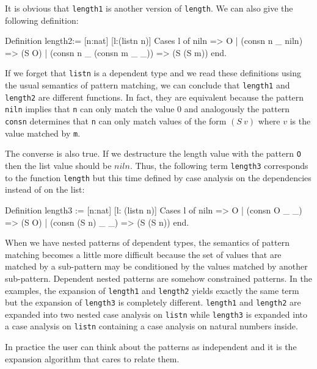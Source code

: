 It is obvious that \texttt{length1} is  another version of
\texttt{length}. We can also give the following definition:
\begin{coq_example}
Definition length2:= [n:nat] [l:(listn n)]
 Cases l of 
     niln                    => O
 | (consn n _ niln)          => (S O)
 | (consn n _ (consn m _ _)) => (S (S m))
 end.
\end{coq_example}

If we forget that \texttt{listn} is a dependent type and we read these
definitions using the usual semantics of pattern matching,  we can conclude
that \texttt{length1}
and \texttt{length2} are different functions.
In fact, they are equivalent
because the pattern \texttt{niln} implies that \texttt{n} can only match
the value $0$ and analogously the pattern \texttt{consn} determines that \texttt{n} can
only match  values of the form  $(S~v)$ where $v$ is the value matched by
\texttt{m}. 

The converse is also true. If
we destructure the  length  value with the pattern \texttt{O} then the list
value should be $niln$. 
Thus, the following term \texttt{length3} corresponds to the function
\texttt{length} but this time defined by case analysis on the dependencies instead of on the list:

\begin{coq_example}
Definition length3 := [n:nat] [l: (listn n)]
                         Cases l of 
                            niln              => O
                         |  (consn O _ _)     => (S O)
                         |  (consn (S n) _ _) => (S (S n))
                         end.
\end{coq_example}

When we have nested patterns of dependent types, the semantics of
pattern matching becomes a little more difficult because
the set of values that are matched by a sub-pattern may be conditioned by the
values matched by another sub-pattern. Dependent nested patterns are
somehow constrained patterns. 
In the examples, the expansion of
\texttt{length1} and \texttt{length2} yields exactly the same term
 but the
expansion of \texttt{length3} is completely different. \texttt{length1} and
\texttt{length2} are expanded into two nested case analysis on
\texttt{listn} while \texttt{length3} is expanded into a case analysis on
\texttt{listn} containing a case analysis on natural numbers inside.


In practice the user can think about the patterns as independent and
it is the expansion algorithm that cares to relate them. \\


